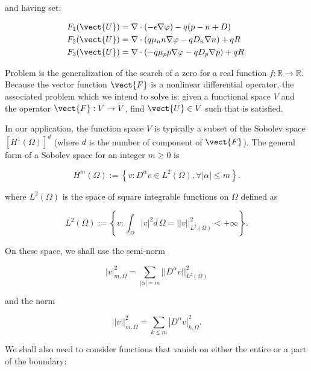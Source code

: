 and having set:

\begin{align*}
F_1(\vect{U}) & = \nabla \cdot (-\epsilon \nabla \varphi) - q(p-n+D) \\
F_2(\vect{U}) & = \nabla \cdot ( q\mu_n n \nabla \varphi - qD_n \nabla n )+qR \\
F_3(\vect{U}) & = \nabla \cdot (- q\mu_p p \nabla \varphi - qD_p \nabla p )+qR.
\end{align*}

Problem  is the generalization of the search of a zero for a real function $f:\mathbb{R}\rightarrow\mathbb{R}$. Because the vector function $\vect{F}$ is a nonlinear differential operator, the associated problem which we intend to solve is: given a functional space $V$ and the operator $\vect{F}:V\rightarrow V$, find $\vect{U}\in V$ such that  is satisfied.

In our application, the function space $V$ is typically a subset of the Sobolev space  $[H^1(\Omega)]^d$ (where $d$ is the number of component of $\vect{F}$). 
The general form of a Sobolev space for an integer $m\geq 0$ is

\begin{equation}
\label{space: Hm}
H^m(\Omega) := \left\{ v : D^{\alpha}v\in L^2(\Omega),\forall |\alpha|\leq m \right\}.
\end{equation}

where $L^2(\Omega)$ is the space of square integrable functions on $\Omega$ defined as

\begin{equation}
\label{space: L2}
L^2(\Omega) := \left\{ v : \int_{\Omega} |v|^2 d\,\Omega =||v||^2_{L^2(\Omega)}<+\infty \right\}.
\end{equation}

On these space, we shall use the semi-norm

\begin{equation}
\label{eq: semiorm sobolev}
|v|_{m,\Omega}^2 = \sum_{|\alpha|=m} ||D^{\alpha}v||^2_{L^2(\Omega)}
\end{equation}

and the norm

\begin{equation}
\label{eq: norm sobolev}
||v||_{m,\Omega}^2 = \sum_{k\leq m} |D^{\alpha}v|^2_{k,\Omega}.
\end{equation}

We shall also need to consider functions that vanish on either the entire or a part of the boundary:

